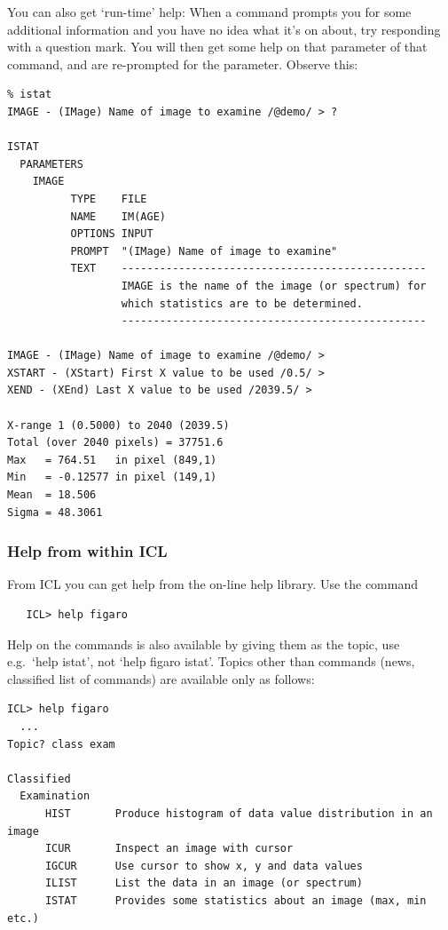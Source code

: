    You can also get `run-time' help: When a command prompts you for
   some additional information and you have no idea what it's on about,
   try responding with a question mark. You will then get some help on
   that parameter of that command, and are re-prompted for the
   parameter. Observe this:

\begin{verbatim}
% istat
IMAGE - (IMage) Name of image to examine /@demo/ > ?

ISTAT
  PARAMETERS
    IMAGE
          TYPE    FILE
          NAME    IM(AGE)
          OPTIONS INPUT
          PROMPT  "(IMage) Name of image to examine"
          TEXT    ------------------------------------------------
                  IMAGE is the name of the image (or spectrum) for
                  which statistics are to be determined.
                  ------------------------------------------------

IMAGE - (IMage) Name of image to examine /@demo/ >
XSTART - (XStart) First X value to be used /0.5/ >
XEND - (XEnd) Last X value to be used /2039.5/ >

X-range 1 (0.5000) to 2040 (2039.5)
Total (over 2040 pixels) = 37751.6
Max   = 764.51   in pixel (849,1)
Min   = -0.12577 in pixel (149,1)
Mean  = 18.506
Sigma = 48.3061
\end{verbatim}

\subsubsection{\label{gethelpicl}Help from within ICL}

   From ICL you can get help from the on-line help library.  Use the command

\begin{verbatim}
   ICL> help figaro
\end{verbatim}

   Help on the commands is also available by giving them as the topic,
   use e.g.\ `help istat', not `help figaro istat'. Topics other than
   commands (news, classified list of commands) are available only as
   follows:

\begin{verbatim}
ICL> help figaro
  ...
Topic? class exam

Classified
  Examination
      HIST       Produce histogram of data value distribution in an image
      ICUR       Inspect an image with cursor
      IGCUR      Use cursor to show x, y and data values
      ILIST      List the data in an image (or spectrum)
      ISTAT      Provides some statistics about an image (max, min etc.)
\end{verbatim}

